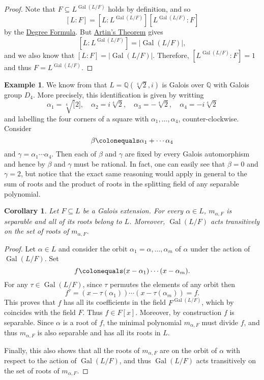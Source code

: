 \documentclass[12pt]{report}
\newtheorem{corollary}[theorem]{Corollary}
\numberwithin{equation}{section}
\numberwithin{theorem}{chapter}
\theoremstyle{definition}
\newtheorem{example}[theorem]{Example}
\newtheorem*{basic properties}{Basic Properties}
\newtheorem*{Important Remark}{Important Remark}
\DeclareMathOperator{\Gal}{Gal}
\begin{document}
\begin{proof} 
Note that $F \subseteq L^{\Gal(L/F)}$ holds by definition, and so 
$$[L:F] = [L: L^{\Gal(L/F)}][L^{\Gal(L/F)} : F]$$ 
by the \hyperref[deg formula]{Degree Formula}. But \hyperref[Artin's theorem]{Artin's Theorem} gives
$$[L: L^{\Gal(L/F)}] = |\Gal(L/F)|,$$ 
and we also know that $[L:F] = |\Gal(L/F)|$. Therefore, $[L^{\Gal(L/F)}:F] = 1$ and thus $F = L^{\Gal(L/F)}$.
\end{proof}


\begin{example} 
We know from  that $L = \mathbb{Q}(\sqrt[4]{2}, i)$ is Galois over $\mathbb{Q}$ with Galois group $D_4$. More precisely, this identification is given by writting 
$$\alpha_1 = \sqrt[4][2], \quad \alpha_2 = i\sqrt[4]{2}, \quad \alpha_3 = -\sqrt[4]{2}, \quad \alpha_4 = -i\sqrt[4]{2}$$ 
and labelling the four corners of a square with $\alpha_1, \ldots, \alpha_4$, counter-clockwise.  Consider 
$$\beta \colonequals \alpha_1 + \cdots \alpha_4$$ 
and $\gamma = \alpha_1 \cdots \alpha_4$. Then each of $\beta$ and $\gamma$ are fixed by every Galois automorphism and hence by  $\beta$ and $\gamma$ must be rational. In fact, one can easily see that $\beta = 0$ and $\gamma = 2$, but notice that the exact same reasoning would apply in general to the sum of roots and the product of roots in the splitting field of any separable polynomial.
\end{example}




\begin{corollary}\label{galois extension all min pols separable}
Let $F \subseteq L$ be a Galois extension.
For every $\alpha \in L$, $m_{\alpha, F}$ is separable and all of its roots belong to $L$. Moreover, $\Gal(L/F)$ acts transitively on the set of roots of $m_{\alpha,F}$.
\end{corollary}

\begin{proof}
Let $\alpha \in L$ and consider the orbit $\alpha_1 = \alpha, \ldots, \alpha_m$
of $\alpha$ under the action of $\Gal(L/F)$. Set
$$f \colonequals (x-\alpha_1) \cdots (x-\alpha_m).$$
For any $\tau \in \Gal(L/F)$, since $\tau$ permutes the elements of any orbit then
$$f^\tau = (x-\tau(\alpha_1)) \cdots (x-\tau(\alpha_m)) = f.$$
This proves that $f$ has all its coefficients in the field $F^{\Gal(L/F)}$, which by  coincides with the field $F$.
Thus $f \in F[x]$. Moreover, by construction $f$ is separable. Since $\alpha$ is a root of $f$, the minimal polynomial $m_{\alpha,F}$ must divide $f$, and thus $m_{\alpha,F}$ is also separable and has all its roots in $L$.

Finally, this also shows that all the roots of $m_{\alpha,F}$ are on the orbit of $\alpha$ with respect to the action of $\Gal(L/F)$, and thus $\Gal(L/F)$ acts transitively on the set of roots of $m_{\alpha,F}$.
\end{proof}
\end{document}

